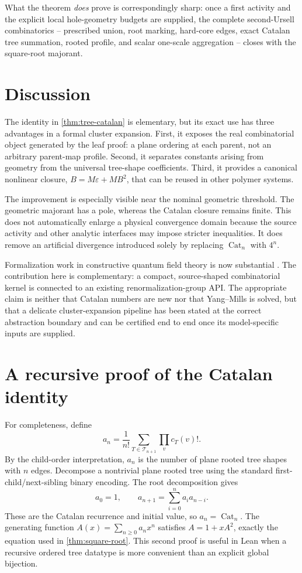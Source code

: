 \documentclass[11pt,a4paper]{article}
\theoremstyle{definition}
\newcommand{\Cat}{\operatorname{Cat}}
\newcommand{\Tree}{\mathcal T}
\newcommand{\eps}{\varepsilon}
\begin{document}
What the theorem \emph{does} prove is correspondingly sharp: once a first activity and
the explicit local hole-geometry budgets are supplied, the complete second-Ursell
combinatorics -- prescribed union, root marking, hard-core edges, exact Catalan tree
summation, rooted profile, and scalar one-scale aggregation -- closes with the
square-root majorant.

\section{Discussion}

The identity in \cref{thm:tree-catalan} is elementary, but its exact use has three
advantages in a formal cluster expansion.  First, it exposes the real combinatorial
object generated by the leaf proof: a plane ordering at each parent, not an arbitrary
parent-map profile.  Second, it separates constants arising from geometry from the
universal tree-shape coefficients.  Third, it provides a canonical nonlinear closure,
$B=M\eps+MB^2$, that can be reused in other polymer systems.

The improvement is especially visible near the nominal geometric threshold.  The
geometric majorant has a pole, whereas the Catalan closure remains finite.  This does
not automatically enlarge a physical convergence domain because the source activity and
other analytic interfaces may impose stricter inequalities.  It does remove an
artificial divergence introduced solely by replacing $\Cat_n$ with $4^n$.

Formalization work in constructive quantum field theory is now substantial
\cite{DouglasEtAl2026}.  The contribution here is complementary: a compact,
source-shaped combinatorial kernel is connected to an existing renormalization-group
API.  The appropriate claim is neither that Catalan numbers are new nor that
Yang--Mills is solved, but that a delicate cluster-expansion pipeline has been stated at
the correct abstraction boundary and can be certified end to end once its
model-specific inputs are supplied.

\appendix

\section{A recursive proof of the Catalan identity}
\label{app:recursive}

For completeness, define
\[
  a_n=\frac1{n!}\sum_{T\in\Tree_{n+1}}\prod_v c_T(v)!.
\]
By the child-order interpretation, $a_n$ is the number of plane rooted tree shapes with
$n$ edges.  Decompose a nontrivial plane rooted tree using the standard
first-child/next-sibling binary encoding.  The root decomposition gives
\[
  a_0=1,
  \qquad
  a_{n+1}=\sum_{i=0}^{n}a_i a_{n-i}.
\]
These are the Catalan recurrence and initial value, so $a_n=\Cat_n$.  The generating
function $A(x)=\sum_{n\ge0}a_nx^n$ satisfies $A=1+xA^2$, exactly the equation used in
\cref{thm:square-root}.  This second proof is useful in Lean when a recursive ordered
tree datatype is more convenient than an explicit global bijection.
\end{document}

